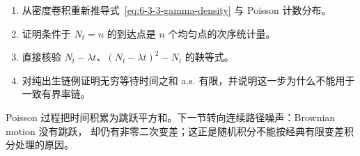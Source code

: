 \begin{exercise}
\begin{enumerate}
 \item 从密度卷积重新推导式~\eqref{eq:6-3-3-gamma-density} 与 Poisson 计数分布。
 \item 证明条件于 $N_t=n$ 的到达点是 $n$ 个均匀点的次序统计量。
 \item 直接核验 $N_t-\lambda t$、$(N_t-\lambda t)^2-N_t$ 的鞅等式。
 \item 对纯出生链例证明无穷等待时间之和 a.s. 有限，并说明这一步为什么不能用于一致有界率链。
\end{enumerate}
\end{exercise}

Poisson 过程把时间积累为跳跃平方和。下一节转向连续路径噪声：Brownian motion 没有跳跃，
却仍有非零二次变差；这正是随机积分不能按经典有限变差积分处理的原因。
